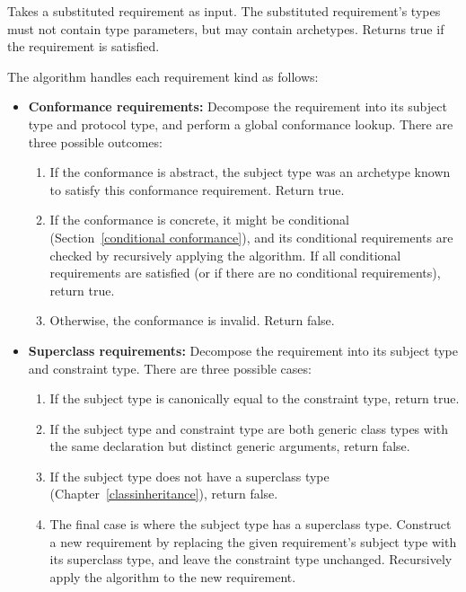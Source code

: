 \documentclass[../generics]{subfiles}
\begin{document}
\begin{algorithm}\label{reqissatisfied}
Takes a substituted requirement as input. The substituted requirement's types must not contain type parameters, but may contain archetypes. Returns true if the requirement is satisfied.

The algorithm handles each requirement kind as follows:
\begin{itemize}
\item \textbf{Conformance requirements:} Decompose the requirement into its subject type and protocol type, and perform a global conformance lookup. There are three possible outcomes:
\begin{enumerate}
\item If the conformance is abstract, the subject type was an archetype known to satisfy this conformance requirement. Return true.
\item If the conformance is concrete, it might be conditional (Section~\ref{conditional conformance}), and its conditional requirements are checked by recursively applying the algorithm. If all conditional requirements are satisfied (or if there are no conditional requirements), return true.
\item Otherwise, the conformance is invalid. Return false.
\end{enumerate}
\item \textbf{Superclass requirements:} Decompose the requirement into its subject type and constraint type. There are three possible cases:
\begin{enumerate}
\item If the subject type is canonically equal to the constraint type, return true.
\item If the subject type and constraint type are both generic class types with the same declaration but distinct generic arguments, return false.
\item If the subject type does not have a superclass type (Chapter~\ref{classinheritance}), return false.
\item The final case is where the subject type has a superclass type. Construct a new requirement by replacing the given requirement's subject type with its superclass type, and leave the constraint type unchanged. Recursively apply the algorithm to the new requirement.

\end{enumerate}
\end{itemize}
\end{algorithm}
\end{document}
